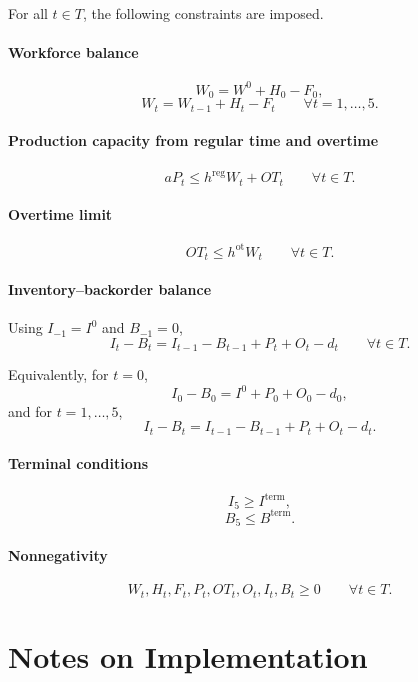 For all \(t \in T\), the following constraints are imposed.

\paragraph{Workforce balance}
\[
W_0 = W^0 + H_0 - F_0,
\]
\[
W_t = W_{t-1} + H_t - F_t \qquad \forall t=1,\dots,5.
\]

\paragraph{Production capacity from regular time and overtime}
\[
a P_t \le h^{\mathrm{reg}} W_t + OT_t \qquad \forall t \in T.
\]

\paragraph{Overtime limit}
\[
OT_t \le h^{\mathrm{ot}} W_t \qquad \forall t \in T.
\]

\paragraph{Inventory--backorder balance}
Using \(I_{-1}=I^0\) and \(B_{-1}=0\),
\[
I_t - B_t = I_{t-1} - B_{t-1} + P_t + O_t - d_t
\qquad \forall t \in T.
\]

Equivalently, for \(t=0\),
\[
I_0 - B_0 = I^0 + P_0 + O_0 - d_0,
\]
and for \(t=1,\dots,5\),
\[
I_t - B_t = I_{t-1} - B_{t-1} + P_t + O_t - d_t.
\]

\paragraph{Terminal conditions}
\[
I_5 \ge I^{\mathrm{term}},
\]
\[
B_5 \le B^{\mathrm{term}}.
\]

\paragraph{Nonnegativity}
\[
W_t,H_t,F_t,P_t,OT_t,O_t,I_t,B_t \ge 0
\qquad \forall t \in T.
\]

\section*{Notes on Implementation}

